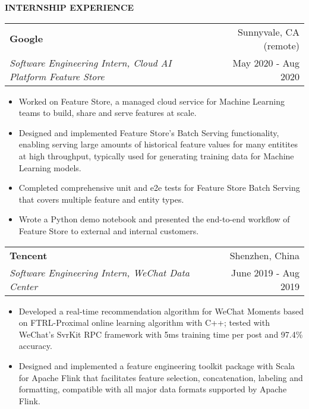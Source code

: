\documentclass[letterpaper,11pt]{article}
\makeatletter
\newcommand{\resitem}[1]{\item  #1}
\newcommand{\resheading}[1]{{\large \colorbox{mygrey}{\begin{minipage}{\linewidth}{\textbf{#1 \vphantom{p\^{E}}}}\end{minipage}}}}
\newcommand{\ressubheading}[4]{
\begin{tabular*}{1.04\linewidth}{l@{\extracolsep{\fill}}r}
		\textbf{#1} & #2 \\
		\textit{#3} & #4 \\
\end{tabular*}\vspace{-6pt}}
\makeatother
\begin{document}
\resheading{INTERNSHIP EXPERIENCE}
	\begin{description}
		\item 
			\ressubheading{Google}{Sunnyvale, CA (remote)}
				{Software Engineering Intern, Cloud AI Platform Feature Store}{May 2020 - Aug 2020}
				{ \footnotesize
				\begin{itemize}
					\resitem{Worked on Feature Store, a managed cloud service for Machine Learning teams to build, share and serve features at scale.}
					\resitem{Designed and implemented Feature Store's Batch Serving functionality, enabling serving large amounts of historical feature values for many entitites at high throughput, typically used for generating training data for Machine Learning models.}
					\resitem{Completed comprehensive unit and e2e tests for Feature Store Batch Serving that covers multiple feature and entity types.}
					\resitem{Wrote a Python demo notebook and presented the end-to-end workflow of Feature Store to external and internal customers.}		
				\end{itemize}
				}
		\item 
			\ressubheading{Tencent}{Shenzhen, China}
				{Software Engineering Intern, WeChat Data Center}{June 2019 - Aug 2019}
				{ \footnotesize
				\begin{itemize}
					\resitem{Developed a real-time recommendation algorithm for WeChat Moments based on FTRL-Proximal online learning algorithm with C++; tested with WeChat's SvrKit RPC framework with 5ms training time per post and 97.4\% accuracy.}
					\resitem{Designed and implemented a feature engineering toolkit package with Scala for Apache Flink that facilitates feature selection, concatenation, labeling and formatting, compatible with all major data formats supported by Apache Flink.}
				\end{itemize}
				}
	\end{description}  %
\end{document}
